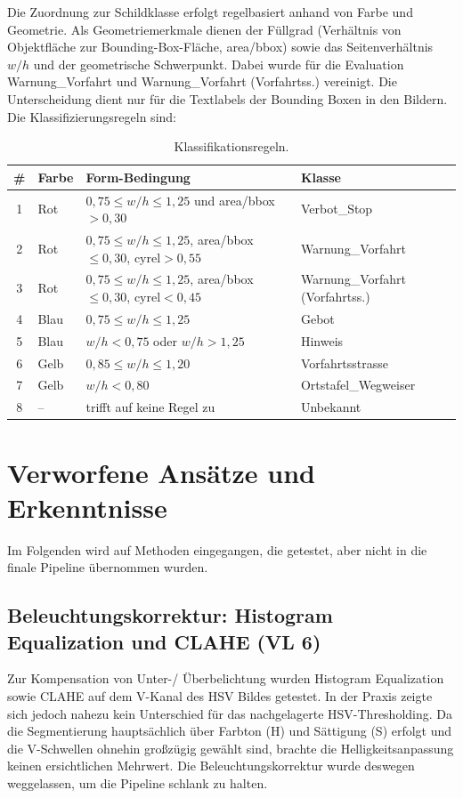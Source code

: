 \documentclass[12pt,oneside]{article}
\begin{document}
Die Zuordnung zur Schildklasse erfolgt regelbasiert anhand von Farbe und Geometrie. Als Geometriemerkmale dienen der Füllgrad (Verhältnis von Objektfläche zur Bounding-Box-Fläche, area/bbox) sowie das Seitenverhältnis $w/h$ und der geometrische Schwerpunkt. Dabei wurde für die Evaluation Warnung\_Vorfahrt und Warnung\_Vorfahrt (Vorfahrtss.) vereinigt. Die Unterscheidung dient nur für die Textlabels der Bounding Boxen in den Bildern.
Die Klassifizierungsregeln sind:

\begin{table}[H]
\centering
\begin{tabular}{|c|l|l|l|}
\hline
\textbf{\#} & \textbf{Farbe} & \textbf{Form-Bedingung} & \textbf{Klasse} \\
\hline
1 & Rot  & $0{,}75 \leq w/h \leq 1{,}25$ und area/bbox $> 0{,}30$ & Verbot\_Stop  \\
2 & Rot  & $0{,}75 \leq w/h \leq 1{,}25$, area/bbox $\leq 0{,}30$, $\text{cyrel} > 0{,}55$ & Warnung\_Vorfahrt \\
3 & Rot  & $0{,}75 \leq w/h \leq 1{,}25$, area/bbox $\leq 0{,}30$,  $\text{cyrel} < 0{,}45$ & Warnung\_Vorfahrt (Vorfahrtss.) \\
4 & Blau & $0{,}75 \leq w/h \leq 1{,}25$ & Gebot \\
5 & Blau & $w/h < 0{,}75$ oder $w/h > 1{,}25$ & Hinweis \\
6 & Gelb & $0{,}85 \leq w/h \leq 1{,}20$ & Vorfahrtsstrasse \\
7 & Gelb & $w/h < 0{,}80$ & Ortstafel\_Wegweiser \\
8 & --   & trifft auf keine Regel zu & Unbekannt \\
\hline
\end{tabular}
\caption{Klassifikationsregeln.}
\end{table}

\section{Verworfene Ansätze und Erkenntnisse}

Im Folgenden wird auf Methoden eingegangen, die getestet, aber nicht in die finale Pipeline übernommen wurden.

\subsection{Beleuchtungskorrektur: Histogram Equalization und CLAHE (VL 6)}

Zur Kompensation von Unter-/ Überbelichtung wurden Histogram Equalization sowie CLAHE auf dem V-Kanal des HSV Bildes getestet. In der Praxis zeigte sich jedoch nahezu kein Unterschied für das nachgelagerte HSV-Thresholding. Da die Segmentierung hauptsächlich über Farbton (H) und Sättigung (S) erfolgt und die V-Schwellen ohnehin großzügig gewählt sind, brachte die Helligkeitsanpassung keinen ersichtlichen Mehrwert. Die Beleuchtungskorrektur wurde deswegen weggelassen, um die Pipeline schlank zu halten.
\end{document}
